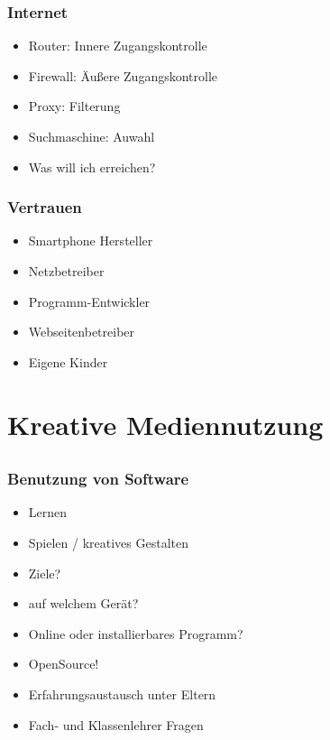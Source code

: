 \documentclass[12pt]{beamer}
\begin{document}
\begin{frame}
	\frametitle{Internet}
	\begin{itemize}
		\item<1-> Router: Innere Zugangskontrolle
		\item<2-> Firewall: Äußere Zugangskontrolle
		\item<3-> Proxy: Filterung
		\item<4-> Suchmaschine: Auwahl
		\item<5-> Was will ich erreichen?
	\end{itemize}
\end{frame}

\begin{frame}
	\frametitle{Vertrauen}
	\begin{itemize}
		\item<1-> Smartphone Hersteller
		\item<2-> Netzbetreiber
		\item<3-> Programm-Entwickler
		\item<4-> Webseitenbetreiber
		\item<5-> Eigene Kinder
	\end{itemize}
\end{frame}


\section{Kreative Mediennutzung}
\subsection{}


\begin{frame}
	\frametitle{Benutzung von Software}
	\begin{itemize}
		\item<1-> Lernen
		\item<2-> Spielen / kreatives Gestalten
	\end{itemize}
	
	\begin{itemize}
		\item<3-> Ziele?
		\item<4-> auf welchem Gerät?
		\item<5-> Online oder installierbares Programm?
		\item<6-> OpenSource!
	\end{itemize}
	
	\begin{itemize}
		\item<7-> Erfahrungsaustausch unter Eltern
		\item<8-> Fach- und Klassenlehrer Fragen
	\end{itemize}
\end{frame}
\end{document}
